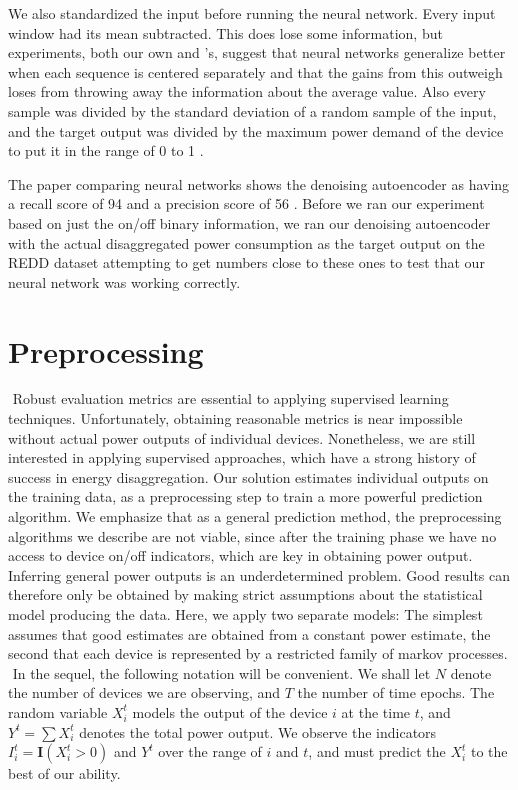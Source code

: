 \documentclass{article}
\begin{document}
We also standardized the input before running the neural network. Every input window had its mean subtracted. This does lose some information, but experiments, both our own and \cite{Kelly}'s, suggest that neural networks generalize better when each sequence is centered separately and that the gains from this outweigh loses from throwing away the information about the average value. Also every sample was divided by the standard deviation of a random sample of the input, and the target output was divided by the maximum power demand of the device to put it in the range of 0 to 1 \cite{Kelly}. 

The paper comparing neural networks shows the denoising autoencoder as having a recall score of 94 and a precision score of 56 \cite{Kelly}. Before we ran our experiment based on just the on/off binary information, we ran our denoising autoencoder with the actual disaggregated power consumption as the target output on the REDD dataset attempting to get numbers close to these ones to test that our neural network was working correctly.


\section{Preprocessing}
​
Robust evaluation metrics are essential to applying supervised learning techniques. Unfortunately, obtaining reasonable metrics is near impossible without actual power outputs of individual devices. Nonetheless, we are still interested in applying supervised approaches, which have a strong history of success in energy disaggregation. Our solution estimates individual outputs on the training data, as a preprocessing step to train a more powerful prediction algorithm. We emphasize that as a general prediction method, the preprocessing algorithms we describe are not viable, since after the training phase we have no access to device on/off indicators, which are key in obtaining power output.
​
Inferring general power outputs is an underdetermined problem. Good results can therefore only be obtained by making strict assumptions about the statistical model producing the data. Here, we apply two separate models: The simplest assumes that good estimates are obtained from a constant power estimate, the second that each device is represented by a restricted family of markov processes.
​
In the sequel, the following notation will be convenient. We shall let $N$ denote the number of devices we are observing, and $T$ the number of time epochs. The random variable $X_i^t$ models the output of the device $i$ at the time $t$, and $Y^t = \sum X_i^t$ denotes the total power output. We observe the indicators $I_i^t = \mathbf{I}(X_i^t > 0)$ and $Y^t$ over the range of $i$ and $t$, and must predict the $X_i^t$ to the best of our ability.
​
\end{document}
